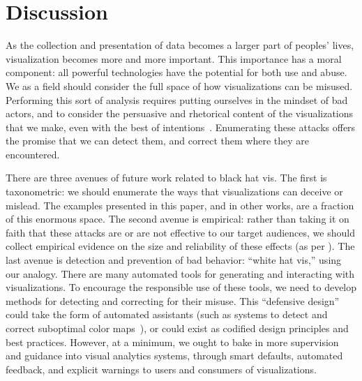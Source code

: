 \documentclass{vgtc}                          %
\begin{document}
\section{Discussion}

As the collection and presentation of data becomes a larger part of peoples' lives, visualization becomes more and more important. This importance has a moral component: all powerful technologies have the potential for both use and abuse. We as a field should consider the full space of how visualizations can be misused. Performing this sort of analysis requires putting ourselves in the mindset of bad actors, and to consider the persuasive and rhetorical content of the visualizations that we make, even with the best of intentions~\cite{hullman2011visualization}. Enumerating these attacks offers the promise that we can detect them, and correct them where they are encountered.

There are three avenues of future work related to black hat vis. The first is taxonometric: we should enumerate the ways that visualizations can deceive or mislead. The examples presented in this paper, and in other works, are a fraction of this enormous space. The second avenue is empirical: rather than taking it on faith that these attacks are or are not effective to our target audiences, we should collect empirical evidence on the size and reliability of these effects (as per \cite{boy2017showing,pandey2014persuasive}). The last avenue is detection and prevention of bad behavior: ``white hat vis,'' using our analogy. There are many automated tools for generating and interacting with visualizations. To encourage the responsible use of these tools, we need to develop methods for detecting and correcting for their misuse. This ``defensive design'' could take the form of automated assistants (such as systems to detect and correct suboptimal color maps~\cite{poco2018extracting}), or could exist as codified design principles and best practices. However, at a minimum, we ought to bake in more supervision and guidance into visual analytics systems, through smart defaults, automated feedback, and explicit warnings to users and consumers of visualizations.

%

%
%
%


\end{document}
